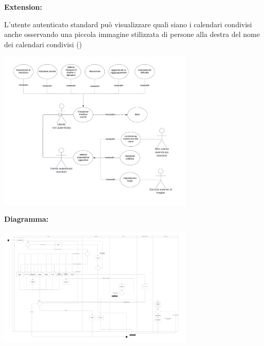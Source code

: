 \begin{listaPersonale}[UC]{}
    \textbf{Extension:}
    \begin{enumerate}[label=\textbf{[extension \arabic{enumii}]}, ref= \textbf{[extension \arabic{enumii}]}]
         L'utente autenticato standard può visualizzare quali siano i calendari condivisi anche osservando una piccola immagine stilizzata di persone alla destra del nome dei calendari condivisi ()
    \end{enumerate}




    \newpage

    \begin{center}
        \includegraphics[width=0.7\textwidth]{img/Diagrammi/UseCases/CreazioneModificaEvento.png}
    \end{center}


    \textbf{Diagramma:}
    \begin{center}
        \includegraphics[width=0.7\textwidth]{img/Diagrammi/DS/DS_CreazioneModificaEvento.png}
    \end{center}





\end{listaPersonale}
